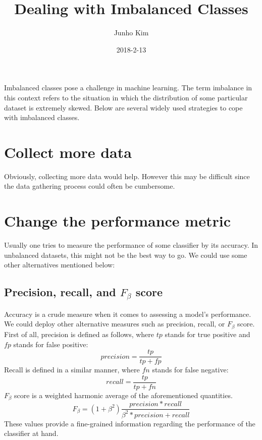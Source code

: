 \documentclass{article}
\title{Dealing with Imbalanced Classes}
\date{2018-2-13}
\author{Junho Kim}
\begin{document}
\maketitle

Imbalanced classes pose a challenge in machine learning. The term imbalance in this context refers to the situation in which the distribution of some particular dataset is extremely skewed. Below are several widely used strategies to cope with imbalanced classes. 
\section{Collect more data}
Obviously, collecting more data would help. However this may be difficult since the data gathering process could often be cumbersome. 
\section{Change the performance metric}
Usually one tries to measure the performance of some classifier by its accuracy. In unbalanced datasets, this might not be the best way to go. We could use some other alternatives mentioned below:
\subsection{Precision, recall, and $F_\beta$ score}
Accuracy is a crude measure when it comes to assessing a model's performance. We could deploy other alternative measures such as precision, recall, or $F_\beta$ score. First of all, precision is defined as follows, where $tp$ stands for true positive and $fp$ stands for false positive:
\begin{equation}
precision = \frac{tp}{tp+fp}
\end{equation}
Recall is defined in a similar manner, where $fn$ stands for false negative:
\begin{equation}
recall = \frac{tp}{tp+fn}
\end{equation}
$F_\beta$ score is a weighted harmonic average of the aforementioned quantities.
\begin{equation}
F_{\beta} = (1+\beta^2)\frac{precision*recall}{\beta^2*precision+recall}
\end{equation}
These values provide a fine-grained information regarding the performance of the classifier at hand.
\end{document}
